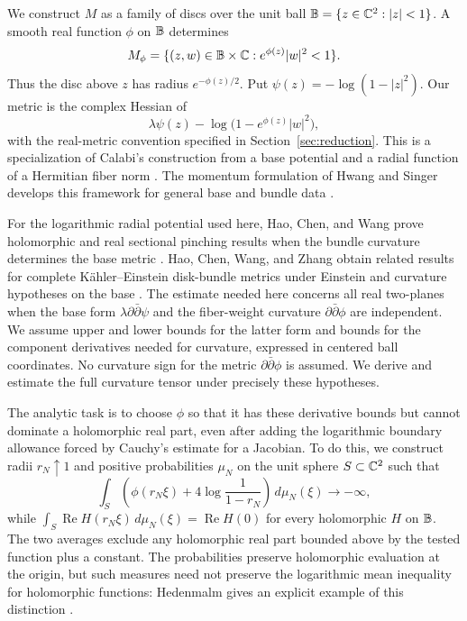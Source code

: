 We construct $M$ as a family of discs over the unit ball
$\mathbb B=\{z\in\mathbb C^2:|z|<1\}$. A smooth real function $\phi$ on $\mathbb B$ determines
\[
 M_\phi=\{(z,w)\in\mathbb B\times\mathbb C:e^{\phi(z)}|w|^2<1\}.
\]
Thus the disc above $z$ has radius $e^{-\phi(z)/2}$. Put
$\psi(z)=-\log(1-|z|^2)$. Our metric is the complex Hessian of
\[
 \lambda\psi(z)-\log\bigl(1-e^{\phi(z)}|w|^2\bigr),
\]
with the real-metric convention specified in
Section~\ref{sec:reduction}. This is a specialization of Calabi's
construction from a base potential and a radial function of a Hermitian
fiber norm \cite[Section~3, equations~(3.1)--(3.2)]{Calabi1979}.
The momentum formulation of Hwang and Singer develops this framework
for general base and bundle data \cite{HwangSinger2002}.

For the logarithmic radial potential used here, Hao, Chen, and Wang
prove holomorphic and real sectional pinching results when the bundle
curvature determines the base metric
\cite[Theorems~1 and~2]{HaoChenWang2025}. Hao, Chen, Wang, and Zhang
obtain related results for complete K\"ahler--Einstein disk-bundle
metrics under Einstein and curvature hypotheses on the base
\cite[Sections~4.2--4.3]{HaoChenWangZhang2026}.
The estimate needed here concerns all real two-planes when the base
form $\lambda\partial\bar\partial\psi$ and the fiber-weight curvature
$\partial\bar\partial\phi$ are independent. We assume upper and lower
bounds for the latter form and bounds for the component derivatives
needed for curvature, expressed in centered ball coordinates. No curvature sign for the metric
$\partial\bar\partial\phi$ is assumed. We derive and estimate the
full curvature tensor under precisely these hypotheses.

The analytic task is to choose $\phi$ so that it has these derivative
bounds but cannot dominate a holomorphic real part, even after adding
the logarithmic boundary allowance forced by Cauchy's estimate for a
Jacobian. To do this, we construct radii $r_N\uparrow1$ and positive
probabilities $\mu_N$ on the unit sphere $S\subset\mathbb C^2$ such that
\[
 \int_S\left(\phi(r_N\xi)+4\log\frac1{1-r_N}\right)
                  \,d\mu_N(\xi)\longrightarrow-\infty,
\]
while $\int_S\operatorname{Re}H(r_N\xi)\,d\mu_N(\xi)
=\operatorname{Re}H(0)$ for every holomorphic $H$ on $\mathbb B$.
The two averages exclude any holomorphic real part bounded above by
the tested function plus a constant. The probabilities preserve
holomorphic evaluation at the origin, but such
measures need not preserve the logarithmic mean inequality for
holomorphic functions: Hedenmalm gives an explicit example of this
distinction \cite[Theorem~3.7]{Hedenmalm1989}.

